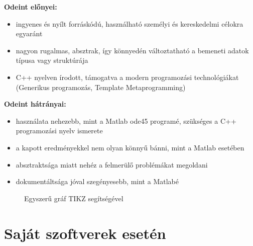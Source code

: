 \textbf{Odeint előnyei:}
\begin{itemize}
	\item ingyenes és nyílt forráskódú, használható személyi és kereskedelmi célokra egyaránt
	\item nagyon rugalmas, absztrak, így könnyedén változtatható a bemeneti adatok típusa vagy struktúrája 
	\item C++ nyelven írodott, támogatva a modern programozási technológiákat (Generikus programozás, Template Metaprogramming)
\end{itemize}
\textbf{Odeint hátrányai:}
\begin{itemize}
	\item használata nehezebb, mint a Matlab ode45 programé, szükséges a C++ programozási nyelv ismerete
	\item a kapott eredményekkel nem olyan könnyű bánni, mint a Matlab esetében
	\item absztraktsága miatt nehéz a felmerülő problémákat megoldani
	\item dokumentáltsága jóval szegényesebb, mint a Matlabé
\end{itemize}




\begin{figure}
	\centering
\caption{Egyszer\H u gr\'af TIKZ seg\'its\'eg\'evel}
\end{figure}



\newpage
\section {Saját szoftverek esetén}

